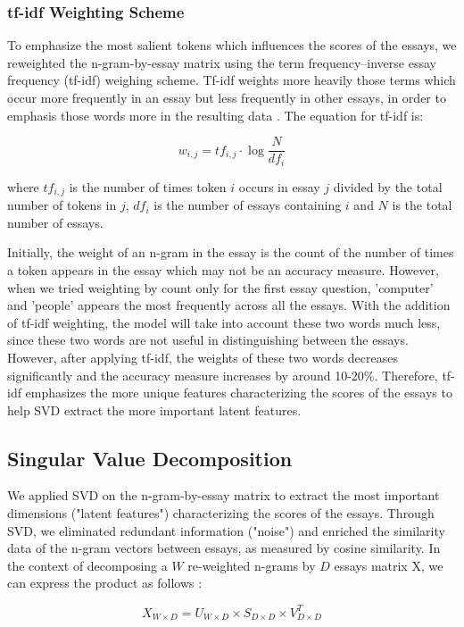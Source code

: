 \documentclass[10pt,letterpaper]{article}
\begin{document}
\subsubsection{tf-idf Weighting Scheme}

To emphasize the most salient tokens which influences the scores of the essays, we reweighted the n-gram-by-essay matrix using the term frequency–inverse essay frequency (tf-idf) weighing scheme. Tf-idf weights more heavily those terms which occur more frequently in an essay but less frequently in other essays, in order to emphasis those words more in the resulting data \cite{islam2010automated}. The equation for tf-idf is:

$$w_{i,j} = tf_{i,j} \cdot \log \frac{N}{df_i}$$

where $tf_{i,j}$ is the number of times token $i$ occurs in essay $j$ divided by the total number of tokens in $j$, $df_i$ is the number of essays containing $i$ and $N$ is the total number of essays.

Initially, the weight of an n-gram in the essay is the count of the number of times a token appears in the essay which may not be an accuracy measure. However, when we tried weighting by count only for the first essay question, 'computer' and 'people' appears the most frequently across all the essays. With the addition of tf-idf weighting, the model will take into account these two words much less, since these two words are not useful in distinguishing between the essays. However, after applying tf-idf, the weights of these two words decreases significantly and the accuracy measure increases by around 10-20\%. Therefore, tf-idf emphasizes the more unique features characterizing the scores of the essays to help SVD extract the more important latent features.

\subsection{Singular Value Decomposition}

We applied SVD on the n-gram-by-essay matrix to extract the most important dimensions ("latent features") characterizing the scores of the essays. Through SVD, we eliminated redundant information ("noise") and enriched the similarity data of the n-gram vectors between essays, as measured by cosine similarity. In the context of decomposing a $W$ re-weighted n-grams by $D$ essays matrix X, we can express the product as follows \cite{islam2010automated}: 

$$X_{W\times D} = U_{W\times D} \times S_{D \times D} \times V^{T}_{D \times D}$$
\end{document}
